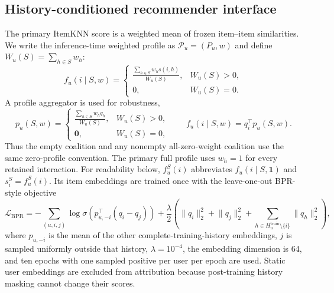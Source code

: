 \documentclass[pdflatex,sn-mathphys-num]{sn-jnl}
\begin{document}
\subsection{History-conditioned recommender interface}
The primary ItemKNN score is a weighted mean of frozen item--item similarities. We write the inference-time weighted profile as $\mathcal{P}_u=(P_u,w)$ and define $W_u(S)=\sum_{h\in S}w_h$:
\begin{equation}
f_u(i\mid S,w)=
\begin{cases}
\displaystyle\frac{\sum_{h\in S}w_hs(i,h)}{W_u(S)},&W_u(S)>0,\\[6pt]
0,&W_u(S)=0.
\end{cases}
\label{eq:itemknn-weighted}
\end{equation}
A profile aggregator is used for robustness,
\begin{equation}
p_u(S,w)=
\begin{cases}
\displaystyle\frac{\sum_{h\in S}w_hq_h}{W_u(S)},&W_u(S)>0,\\[6pt]
\mathbf 0,&W_u(S)=0,
\end{cases}
\qquad f_u(i\mid S,w)=q_i^\top p_u(S,w).
\label{eq:profile-weighted}
\end{equation}
Thus the empty coalition and any nonempty all-zero-weight coalition use the same zero-profile convention. The primary full profile uses $w_h=1$ for every retained interaction. For readability below, $f_u^S(i)$ abbreviates $f_u(i\mid S,\mathbf{1})$ and $s_i^S=f_u^S(i)$.
Its item embeddings are trained once with the leave-one-out BPR-style objective
\begin{equation}
\mathcal{L}_{\mathrm{BPR}}=-\sum_{(u,i,j)}\log\sigma\left(p_{u,-i}^{\top}(q_i-q_j)\right)
+\frac{\lambda}{2}\left(\lVert q_i\rVert_2^2+\lVert q_j\rVert_2^2+\sum_{h\in H_u^{\mathrm{train}}\setminus\{i\}}\lVert q_h\rVert_2^2\right),
\label{eq:bpr}
\end{equation}
where $p_{u,-i}$ is the mean of the other complete-training-history embeddings, $j$ is sampled uniformly outside that history, $\lambda=10^{-4}$, the embedding dimension is 64, and ten epochs with one sampled positive per user per epoch are used. Static user embeddings are excluded from attribution because post-training history masking cannot change their scores.
\end{document}
